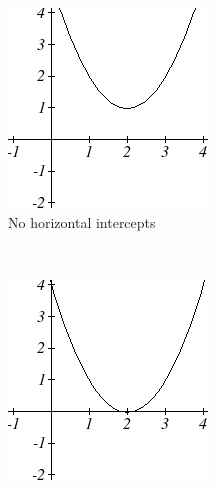 \begin{figure}[!ht]
    \centering
    \begin{subfigure}[b]{0.3\textwidth}
        \includegraphics[width=\textwidth]{img/chap1/sec1-5/image058.png}
        \caption{No horizontal intercepts}
    \end{subfigure}
    ~
    \begin{subfigure}[b]{0.3\textwidth}
        \includegraphics[width=\textwidth]{img/chap1/sec1-5/image059.png}

\end{subfigure}
\end{figure}
